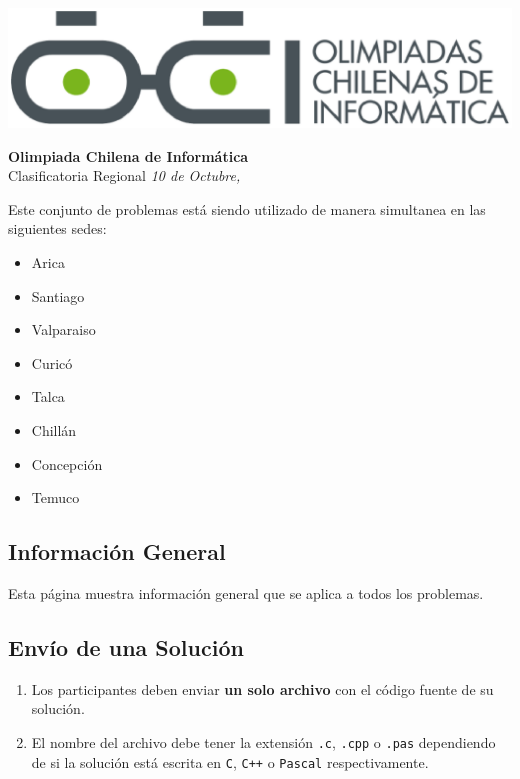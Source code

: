 \documentclass[12pt]{oci}
\begin{document}
\begin{titlingpage}
  \begin{center}
  \includegraphics[scale=0.6]{logo.eps}

  \vskip 70pt
  \Large{\bf Olimpiada Chilena de Inform\'atica\\ \the\year}
  \vskip 10pt
  \large{Clasificatoria Regional}
  \vskip 10pt
  \normalsize{\it 10 de Octubre, \the\year}


  \vskip 95pt

  \end{center}
  Este conjunto de problemas est\'a siendo utilizado de manera simultanea en las siguientes sedes:

  \begin{itemize}[leftmargin=*]
  \item Arica
  \item Santiago
  \item Valparaiso
  \item Curic\'o
  \item Talca
  \item Chill\'an
  \item Concepci\'on
  \item Temuco
  \end{itemize}
\end{titlingpage}


\subsection*{Informaci\'on General}

Esta p\'agina muestra informaci\'on general que se aplica a todos los problemas.

\subsection*{Env\'io de una Soluci\'on}


\begin{enumerate}
\itemsep 0em
\item Los participantes deben enviar {\bf un solo archivo} con el c\'odigo fuente de su soluci\'on.
\item El nombre del archivo debe tener la extensi\'on \verb+.c+, \verb+.cpp+ o \verb+.pas+ dependiendo de si la soluci\'on est\'a escrita en \verb|C|, \verb|C++| o \verb|Pascal| respectivamente.
\end{enumerate}
\end{document}
